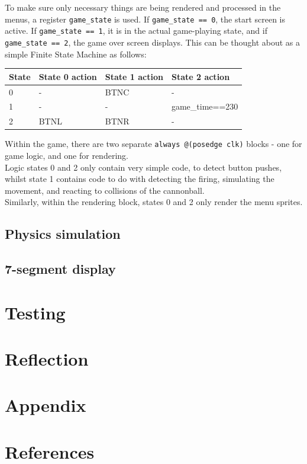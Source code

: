 \documentclass{ifda}
\begin{document}
To make sure only necessary things are being rendered and processed in the menus, a register \verb|game_state| is used. If \verb|game_state == 0|, the start screen is active. If \verb|game_state == 1|, it is in the actual game-playing state, and if \verb|game_state == 2|, the game over screen displays. This can be thought about as a simple Finite State Machine as follows:\\
\begin{table}[h]
\begin{tabular}{|l|l|l|l|}
\hline
State & State 0 action & State 1 action & State 2 action \\ \hline
0 & - & BTNC & - \\ \hline
1 & - & - & game\_time==230 \\ \hline
2 & BTNL & BTNR & - \\ \hline
\end{tabular}
\end{table}

Within the game, there are two separate \verb|always @(posedge clk)| blocks - one for game logic, and one for rendering.\\
Logic states 0 and 2 only contain very simple code, to detect button pushes, whilst state 1 contains code to do with detecting the firing, simulating the movement, and reacting to collisions of the cannonball.\\
Similarly, within the rendering block, states 0 and 2 only render the menu sprites.\\

\subsection{Physics simulation}

\subsection{7-segment display}

\section{Testing}

\section{Reflection}


\section{Appendix}


\section{References}
\nocite{*}


\end{document}
